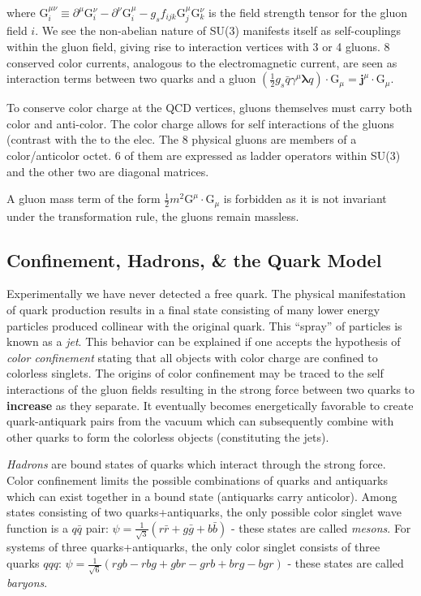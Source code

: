 where $\mathrm{G}^{\mu\nu}_{i} \equiv \partial^{\mu} \mathrm{G}^{\nu}_{i} - \partial^{\nu} \mathrm{G}^{\mu}_{i} - g_{s} f_{ijk} \mathrm{G}^{\mu}_{j} \mathrm{G}^{\nu}_{k}$ is the field strength tensor for the gluon field $i$. We see the non-abelian nature of SU(3) manifests itself as self-couplings within the gluon field, giving rise to interaction vertices with 3 or 4 gluons. 8 conserved color currents, analogous to the electromagnetic current, are seen as interaction terms between two quarks and a gluon $(\frac{1}{2} g_{s} \bar{q} \gamma^{\mu} \bm{\lambda} q) \cdot \bm{\mathrm{G}}_{\mu} = \bm{j}^{\mu} \cdot \bm{\mathrm{G}}_{\mu}$.

To conserve color charge at the QCD vertices, gluons themselves must carry both color and anti-color. The color charge allows for self interactions of the gluons (contrast with the  to the elec. The 8 physical gluons are members of a color/anticolor octet. 6 of them are expressed as ladder operators within SU(3) and the other two are diagonal matrices.

A gluon mass term of the form $\frac{1}{2}m^{2}\bm{\mathrm{G}}^{\mu} \cdot \bm{\mathrm{G}}_{\mu}$ is forbidden as it is not invariant under the transformation rule, the gluons remain massless.

\subsection{Confinement, Hadrons, \& the Quark Model}

Experimentally we have never detected a free quark. The physical manifestation of quark production results in a final state consisting of many lower energy particles produced collinear with the original quark. This ``spray'' of particles is known as a \textit{jet}. This behavior can be explained if one accepts the hypothesis of \textit{color confinement} stating that all objects with color charge are confined to colorless singlets. The origins of color confinement may be traced to the self interactions of the gluon fields resulting in the strong force between two quarks to \textbf{increase} as they separate. It eventually becomes energetically favorable to create quark-antiquark pairs from the vacuum which can subsequently combine with other quarks to form the colorless objects (constituting the jets).

\textit{Hadrons} are bound states of quarks which interact through the strong force. Color confinement limits the possible combinations of quarks and antiquarks which can exist together in a bound state (antiquarks carry anticolor). Among states consisting of two quarks+antiquarks, the only possible color singlet wave function is a $q\bar{q}$ pair: $\psi = \frac{1}{\sqrt{3}} (r\bar{r} + g\bar{g} + b\bar{b})$ - these states are called \textit{mesons}. For systems of three quarks+antiquarks, the only color singlet consists of three quarks $qqq$: $\psi = \frac{1}{\sqrt{6}} (rgb - rbg + gbr - grb +brg-bgr)$ - these states are called \textit{baryons}.

